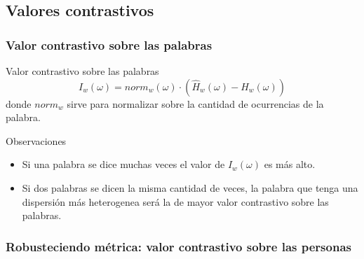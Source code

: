 \subsection{Valores contrastivos}
\begin{frame}[t]\frametitle{Valor contrastivo sobre las palabras}
    \begin{alertblock}{Valor contrastivo sobre las palabras}
        \begin{equation}
            I_w(\omega) = norm_{w}(\omega) \cdot (\widehat{H}_{w}(\omega) - H_{w}(\omega))
            \label{eq:iw}
        \end{equation}
        donde $norm_w$ sirve para normalizar sobre la cantidad de ocurrencias de la palabra.
    \end{alertblock}

    \begin{block}{Observaciones}
        \begin{itemize}
            \item Si una palabra se dice muchas veces el valor de $I_w(\omega)$ es más alto.
            \item Si dos palabras se dicen la misma cantidad de veces, la palabra que tenga una dispersión más heterogenea será la de mayor valor contrastivo sobre las palabras.
        \end{itemize}
    \end{block}

\end{frame}

\begin{frame}[t]\frametitle{Robusteciendo métrica: valor contrastivo sobre las personas}



    
\end{frame}

